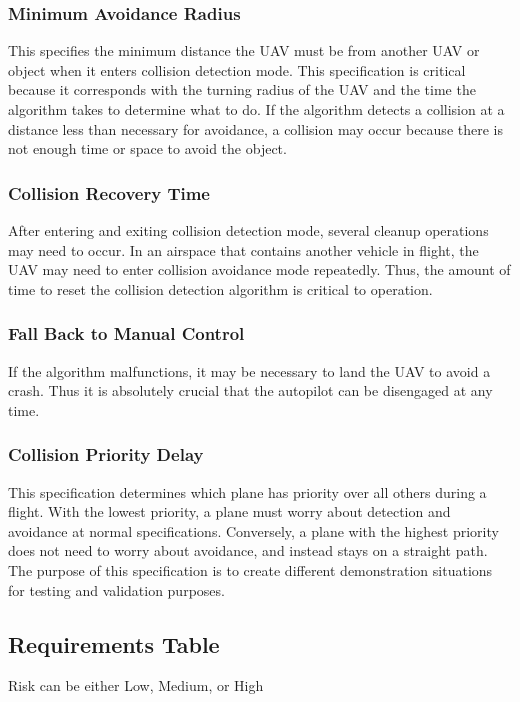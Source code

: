 \documentclass[12pt]{article}
\begin{document}
\subsubsection{Minimum Avoidance Radius}
This specifies the minimum distance the UAV must be from another UAV or object when it enters collision detection mode. This specification is critical because it corresponds with the turning radius of the UAV and the time the algorithm takes to determine  what to do. If the algorithm detects a collision at a distance less than necessary for avoidance, a collision may occur because there is not enough time or space to avoid the object.

\subsubsection{Collision Recovery Time}
After entering and exiting collision detection mode, several cleanup operations may need to occur. In an airspace that contains another vehicle in flight, the UAV may need to enter collision avoidance mode repeatedly. Thus, the amount of time to reset the collision detection algorithm is critical to operation.

\subsubsection{Fall Back to Manual Control}
If the algorithm malfunctions, it may be necessary to land the UAV to avoid a crash. Thus it is absolutely crucial that the autopilot can be disengaged at any time.

\subsubsection{Collision Priority Delay}
This specification determines which plane has priority over all others during a flight. With the lowest priority, a plane must worry about detection and avoidance at normal specifications. Conversely, a plane with the highest priority does not need to worry about avoidance, and instead stays on a straight path. The purpose of this specification is to create different demonstration situations for testing and validation purposes.

\subsection{Requirements Table}

Risk can be either Low, Medium, or High
\end{document}
